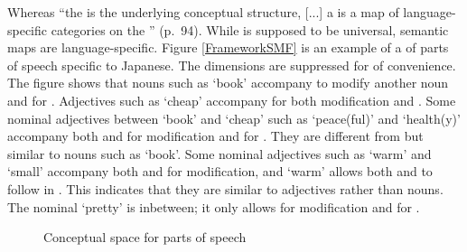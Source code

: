 Whereas
``the  is the underlying conceptual structure,
[...] a  is a map of language-specific categories on the '' (p.\ 94).
While  is supposed to be universal,
semantic maps are language-specific.
Figure \ref{FrameworkSMF} is an example of a  of parts of speech specific to Japanese.
The dimensions are suppressed for of convenience.
The figure shows that
nouns such as  `book' accompany  to modify another noun and  for . %
Adjectives such as  `cheap' accompany  for both modification and . %
Some nominal adjectives between `book' and `cheap' such as  `peace(ful)' and  `health(y)' accompany both  and  for modification and  for .
They are different from but similar to nouns such as `book'.
Some nominal adjectives such as  `warm' and  `small' accompany both  and  for modification, and
`warm' allows both  and  to follow in .
This indicates that
they are similar to adjectives rather than nouns.
The nominal   `pretty' is inbetween;
it only allows  for modification and  for .

\begin{figure}
 \caption{Conceptual space for parts of speech \cite[92]{croft01}}
 \label{FrameworkCSF}
\end{figure}

